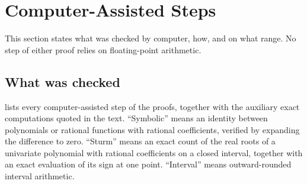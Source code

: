 \documentclass[11pt, a4paper]{article}
\theoremstyle{definition}
\begin{document}
\section{Computer-Assisted Steps}
\label{sec:computer}

This section states what was checked by computer, how, and on what range. No step of either proof relies on
floating-point arithmetic.

\subsection{What was checked}

 lists every computer-assisted step of the proofs, together with the auxiliary exact computations
quoted in the text. ``Symbolic'' means an identity between polynomials or rational functions with rational
coefficients, verified by expanding the difference to zero. ``Sturm'' means an exact count of the real roots of a
univariate polynomial with rational coefficients on a closed interval, together with an exact evaluation of its sign at
one point. ``Interval'' means outward-rounded interval arithmetic.
\end{document}
